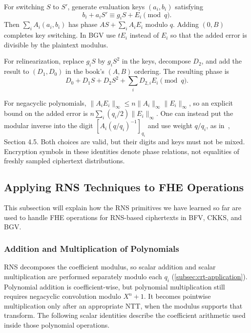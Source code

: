 \begin{tcolorbox}[title={\textbf{\tboxlabel{\ref*{subsec:rns-decompmult}} \textsf{DecompMult\textsubscript{RNS}}}}]
For switching $S$ to $S'$, generate evaluation keys $(a_i,b_i)$ satisfying
\[
b_i+a_iS'\equiv g_iS+E_i\pmod q.
\]
Then $\sum_iA_i(a_i,b_i)$ has phase $AS+\sum_iA_iE_i$ modulo $q$. Adding $(0,B)$ completes key switching. In BGV use $tE_i$ instead of $E_i$ so that the added error is divisible by the plaintext modulus.

For relinearization, replace $g_iS$ by $g_iS^2$ in the keys, decompose $D_2$, and add the result to $(D_1,D_0)$ in the book's $(A,B)$ ordering. The resulting phase is
\[
D_0+D_1S+D_2S^2+\sum_iD_{2,i}E_i\pmod q.
\]
\end{tcolorbox}

For negacyclic polynomials, $\|A_iE_i\|_\infty\leq n\|A_i\|_\infty\|E_i\|_\infty$, so an explicit bound on the added error is $n\sum_i(q_i/2)\|E_i\|_\infty$. One can instead put the modular inverse into the digit $[A_i(q/q_i)^{-1}]_{q_i}$ and use weight $q/q_i$, as in~\cite{rns-bfv}, Section 4.5. Both choices are valid, but their digits and keys must not be mixed. Encryption symbols in these identities denote phase relations, not equalities of freshly sampled ciphertext distributions.


\subsection{Applying RNS Techniques to FHE Operations}
\label{subsec:rns-application}

This subsection will explain how the RNS primitives we have learned so far are used to handle FHE operations for RNS-based ciphertexts in BFV, CKKS, and BGV.


\subsubsection{Addition and Multiplication of Polynomials}
\label{subsubsec:rns-application-basic}

RNS decomposes the coefficient modulus, so scalar addition and scalar multiplication are performed separately modulo each $q_i$ (\autoref{subsec:crt-application}). Polynomial addition is coefficient-wise, but polynomial multiplication still requires negacyclic convolution modulo $X^n+1$. It becomes pointwise multiplication only after an appropriate NTT, when the modulus supports that transform. The following scalar identities describe the coefficient arithmetic used inside those polynomial operations.


